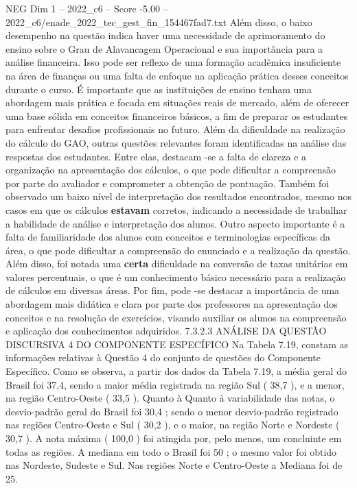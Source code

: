 \begin{textsample}{NEG Dim 1 – 2022\_c6 – Score -5.00 – 2022\_c6/enade\_2022\_tec\_gest\_fin\_154467fad7.txt}
Além disso, o baixo desempenho na questão indica haver uma necessidade de aprimoramento do ensino sobre o Grau de Alavancagem Operacional e sua importância para a análise financeira.
Isso pode ser reflexo de uma formação acadêmica insuficiente na área de finanças ou uma falta de enfoque na aplicação prática desses conceitos durante o curso.
É importante que as instituições de ensino tenham uma abordagem mais prática e focada em situações reais de mercado, além de oferecer uma base sólida em conceitos financeiros básicos, a fim de preparar os estudantes para enfrentar desafios profissionais no futuro.
Além da dificuldade na realização do cálculo do GAO, outras questões relevantes foram identificadas na análise das respostas dos estudantes.
Entre elas, destacam -se a falta de clareza e a organização na apresentação dos cálculos, o que pode dificultar a compreensão por parte do avaliador e comprometer a obtenção de pontuação.
Também foi observado um baixo nível de interpretação dos resultados encontrados, mesmo nos casos em que os cálculos \textbf{estavam} corretos, indicando a necessidade de trabalhar a habilidade de análise e interpretação dos alunos.
Outro aspecto importante é a falta de familiaridade dos alunos com conceitos e terminologias específicas da área, o que pode dificultar a compreensão do enunciado e a realização da questão.
Além disso, foi notada uma \textbf{certa} dificuldade na conversão de taxas unitárias em valores percentuais, o que é um conhecimento básico necessário para a realização de cálculos em diversas áreas.
Por fim, pode -se destacar a importância de uma abordagem mais didática e clara por parte dos professores na apresentação dos conceitos e na resolução de exercícios, visando auxiliar os alunos na compreensão e aplicação dos conhecimentos adquiridos. 7.3.2.3 ANÁLISE DA QUESTÃO DISCURSIVA 4 DO COMPONENTE ESPECÍFICO Na Tabela 7.19, constam as informações relativas à Questão 4 do conjunto de questões do Componente Específico.
Como se observa, a partir dos dados da Tabela 7.19, a média geral do Brasil foi 37,4, sendo a maior média registrada na região Sul ( 38,7 ), e a menor, na região Centro-Oeste ( 33,5 ).
Quanto à Quanto à variabilidade das notas, o desvio-padrão geral do Brasil foi 30,4 ; sendo o menor desvio-padrão registrado nas regiões Centro-Oeste e Sul ( 30,2 ), e o maior, na região Norte e Nordeste ( 30,7 ).
A nota máxima ( 100,0 ) foi atingida por, pelo menos, um concluinte em todas as regiões.
A mediana em todo o Brasil foi 50 ; o mesmo valor foi obtido nas Nordeste, Sudeste e Sul.
Nas regiões Norte e Centro-Oeste a Mediana foi de 25.

\end{textsample}

